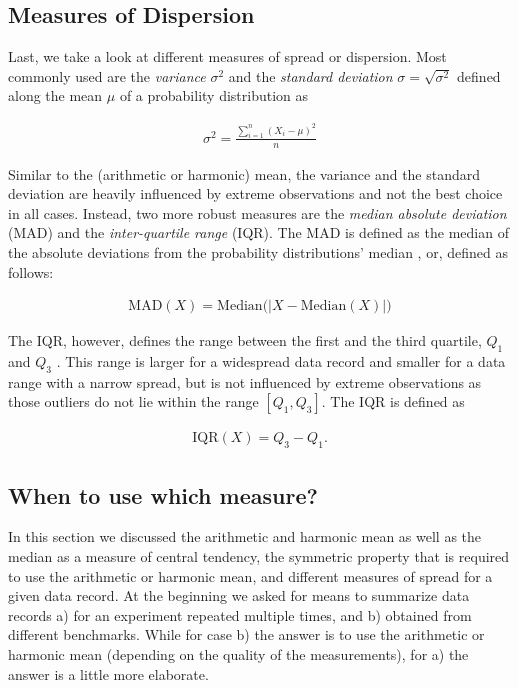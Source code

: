 \subsection{Measures of Dispersion}

Last, we take a look at different measures of spread or dispersion. Most
commonly used are the \emph{variance} $\sigma^2$ and the \emph{standard
deviation} $\sigma = \sqrt{\sigma^2}$ defined along the mean $\mu$ of a
probability distribution as

\begin{equation} \label{eq:variance}
\begin{split}
\sigma^2 = \frac{\sum_{i=1}^{n}(X_i - \mu)^2}{n}
\end{split}
\end{equation}

Similar to the (arithmetic or harmonic) mean, the variance and the standard
deviation are heavily influenced by extreme observations
\citep{shanmugam_statistics_2015} and not the best choice in all cases. Instead,
two more robust measures are the \emph{median absolute deviation} (MAD) and the \emph{inter-quartile range} (IQR). The MAD is defined as the median of the absolute deviations from the probability distributions'
median \citep{molyneaux_art_2014}, or, defined as follows:

\begin{equation} \label{eq:mad}
\begin{split}
\mathrm{MAD}(X) = \mathrm{Median}\big(|X - \mathrm{Median}(X)|\big)
\end{split}
\end{equation}
 
The IQR, however, defines the range between the first and the third quartile,
$Q_1$ and $Q_3$ \citep{shanmugam_statistics_2015}. This range is larger for a
widespread data record and smaller for a data range with a narrow spread, but is not influenced by extreme
observations as those outliers do not lie within the range $\left[ Q_1,Q_3
\right] $. The IQR is defined as 

\begin{equation} \label{eq:iqr}
\begin{split}
\mathrm{IQR}(X) = Q_3 - Q_1.
\end{split}
\end{equation}

\subsection{When to use which measure?}
In this section we discussed the arithmetic and harmonic mean as well as the
median as a measure of central tendency, the symmetric property that is
required to use the arithmetic or harmonic mean, and different measures of
spread for a given data record. At the beginning we asked for means to
summarize data records a) for an experiment repeated multiple times, and b)
obtained from different benchmarks. While for case b) the answer is to use the
arithmetic or harmonic mean (depending on the quality of the measurements), for
a) the answer is a little more elaborate.

